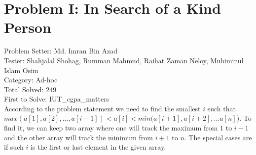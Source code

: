 \section*{Problem I: In Search of a Kind Person}
Problem Setter: Md. Imran Bin Azad \\
Tester: Shahjalal Shohag, Rumman Mahmud, Raihat Zaman Neloy, Muhiminul Islam Osim \\
Category: Ad-hoc \\
Total Solved: 249 \\
First to Solve: IUT\_cgpa\_matters\\

According to the problem statement we need to find the smallest $i$ such that
$max(a[1], a[2], ... , a[i-1]) < a[i] < min(a[i+1], a[i+2], ... a[n]$). To find
it, we can keep two array where one will track the maximum from $1$ to $i-1$
and the other array will track the minimum from $i+1$ to $n$. The special cases
are if such $i$ is the first or last element in the given array.